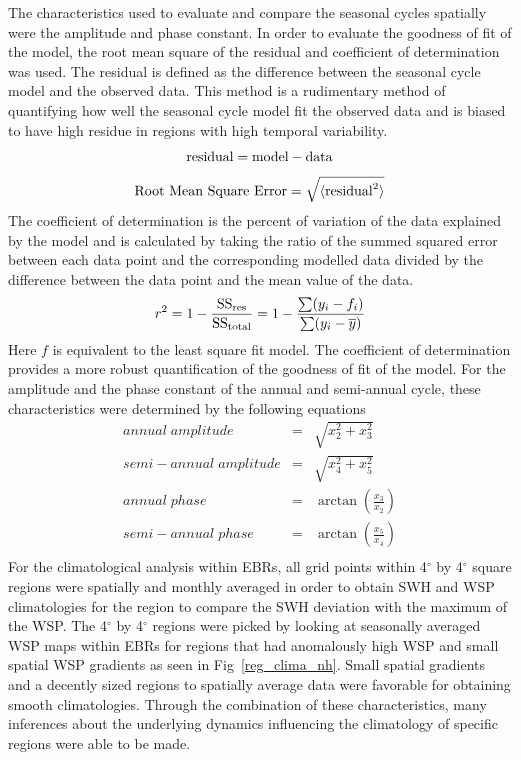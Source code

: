 \documentclass[draft,linenumbers]{agujournal2018}
\begin{document}
The characteristics used to evaluate and compare the seasonal cycles spatially were the amplitude and phase constant. In order to evaluate the goodness of fit of the model, the root mean square of the residual and coefficient of determination was used. The residual is defined as the difference between the seasonal cycle model and the observed data. This method is a rudimentary method of quantifying how well the seasonal cycle model fit the observed data and is biased to have high residue in regions with high temporal variability.
\begin{equation}
    \mbox{\rm residual} = \mbox{\rm model} - \mbox{\rm data} 
\end{equation}
\begin{equation}
    \mbox{\rm Root Mean Square Error} = \sqrt{\langle \mbox{\rm residual}^2\rangle} 
\end{equation}
The coefficient of determination is the percent of variation of the data explained by the model and is calculated by taking the ratio of the summed squared error between each data point and the corresponding modelled data divided by the difference between the data point and the mean value of the data.
\begin{equation}
 r^{2} = 1 - \frac{\rm SS_{res}}{\rm SS_{total}} = 1- \frac{\sum (y_i - f_i)}{\sum (y_i - \overline{y})}
 \end{equation}
Here $f$ is equivalent to the least square fit model. The coefficient of determination provides a more robust quantification of the goodness of fit of the model. For the amplitude and the phase constant of the annual and semi-annual cycle, these characteristics were determined by the following equations
 \begin{eqnarray}
     annual\;amplitude & = & \sqrt{x_2^{2} + x_3^{2}}\\
    semi-annual\;amplitude & = & \sqrt{x_4^{2} + x_5^{2}}\\
     annual\;phase & = & \arctan{\left(\frac{x_3}{x_2}\right)} \\
    semi-annual\;phase & = & \arctan{\left(\frac{x_5}{x_4}\right)}\\
 \end{eqnarray}
For the climatological analysis within EBRs, all grid points within 4$^{\circ}$ by 4$^{\circ}$ square regions were spatially and monthly averaged in order to obtain SWH and WSP climatologies for the region to compare the SWH deviation with the maximum of the WSP. The 4$^{\circ}$ by 4$^{\circ}$ regions were picked by looking at seasonally averaged WSP maps within EBRs for regions that had anomalously high WSP and small spatial WSP gradients as seen in Fig~\ref{reg_clima_nh}. Small spatial gradients and a decently sized regions to spatially average data were favorable for obtaining smooth climatologies. Through the combination of these characteristics, many inferences about the underlying dynamics influencing the climatology of specific regions were able to be made. 
\end{document}
